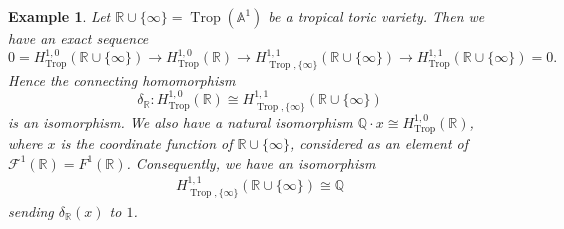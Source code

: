 \documentclass[12pt,a4]{amsart}
\newtheorem{exam}[thm]{Example}
\def\A{\mathbb{A}}
\def\R{\mathbb{R}}
\def\Q{\mathbb{Q}}
\def\F{\mathscr{F}}
\def\Trop{\mathop{\mathrm{trop}}\nolimits}
\def\Trop{\mathop{\mathrm{Trop}}\nolimits}
\numberwithin{equation}{section}
\numberwithin{figure}{section}
\begin{document}
  \begin{exam}
   Let $\R\cup \{\infty\} = \Trop (\A^1)$ be a tropical toric variety. 
   Then we have an exact sequence 
    $$ 0 = H^{1,0}_{\Trop} (\R \cup \{\infty\}) 
         \to  H^{1,0}_{\Trop} (\R ) 
         \to  H^{1,1}_{\Trop, \{ \infty \} } (\R \cup \{\infty\}) 
         \to  H^{1,1}_{\Trop} (\R \cup \{\infty\}) =0.$$
    Hence the connecting homomorphism 
         $$ \delta_{\R} \colon H^{1,0}_{\Trop} (\R ) 
         \cong  H^{1,1}_{\Trop, \{ \infty \} } (\R \cup \{\infty\}) $$
      is an isomorphism.
    We also have a natural isomorphism  
     $\Q \cdot x \cong  H^{1,0}_{\Trop} (\R ) $, 
     where $ x $ is the coordinate function of $\R \cup \{ \infty \}$, considered as an element of $\F^1 (\R) = F^1 (\R)$.
    Consequently, we have an isomorphism 
     \begin{align} \label{eq. signs H^1,1 R }
        H^{1,1}_{\Trop, \{ \infty \} } (\R \cup \{\infty\}) 
       \cong \Q
     \end{align}
      sending $\delta_{\R} (x)$ to $1$.
  \end{exam}
\end{document}
